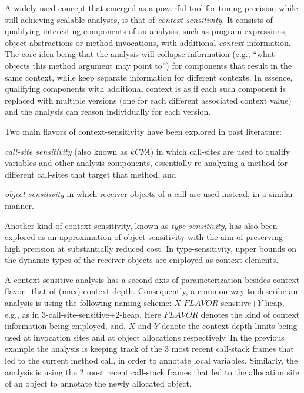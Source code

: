 A widely used concept that emerged as a powerful tool for tuning precision
while still achieving scalable analyses, is that of \emph{context-sensitivity}.
It consists of qualifying interesting components of an analysis, such as
program expressions, object abstractions or method invocations, with additional
\emph{context} information. The core idea being that the analysis will collapse
information (e.g., ``what objects this method argument may point to'') for
components that result in the same context, while keep separate information for
different contexts. In essence, qualifying components with additional context
is as if each such component is replaced with multiple versions (one for each
different associated context value) and the analysis can reason individually
for each version.

Two main flavors of context-sensitivity have been explored in past literature:
\begin{inparaenum}[(1)]
\item \emph{call-site sensitivity} (also known as \emph{kCFA}) in which
	call-sites are used to qualify variables and other analysis components,
	essentially re-analyzing a method for different call-sites that target that
	method, and
\item \emph{object-sensitivity} in which receiver objects of a call are used
	instead, in a similar manner.
\end{inparaenum}
Another kind of context-sensitivity, known as \emph{type-sensitivity}, has also
been explored as an approximation of object-sensitivity with the aim of
preserving high precision at substantially reduced cost. In type-sensitivity,
upper bounds on the dynamic types of the receiver objects are employed as
context elements. 

A context-sensitive analysis has a second axis of parameterization besides
context flavor --that of (max) context depth. Consequently, a common way to
describe an analysis is using the following naming scheme:
$X$-$FLAVOR$-sensitive+$Y$-heap, e.g., as in 3-call-site-sensitive+2-heap. Here
$FLAVOR$ denotes the kind of context information being employed, and, $X$ and
$Y$ denote the context depth limits being used at invocation sites and at
object allocations respectively. In the previous example the analysis is
keeping track of the 3 most recent call-stack frames that led to the current
method call, in order to annotate local variables. Similarly, the analysis is
using the 2 most recent call-stack frames that led to the allocation site of an
object to annotate the newly allocated object.


